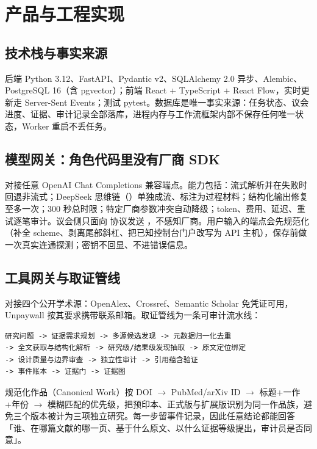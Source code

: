 \section{产品与工程实现}

\subsection{技术栈与事实来源}

后端 Python 3.12、FastAPI、Pydantic v2、SQLAlchemy 2.0 异步、Alembic、PostgreSQL 16（含 pgvector）；前端 React + TypeScript + React Flow，实时更新走 Server-Sent Events；测试 pytest。数据库是唯一事实来源：任务状态、议会进度、证据、审计记录全部落库，进程内存与工作流框架内部不保存任何唯一状态，Worker 重启不丢任务。

\subsection{模型网关：角色代码里没有厂商 SDK}

 对接任意 OpenAI Chat Completions 兼容端点。能力包括：流式解析并在失败时回退非流式；DeepSeek 思维链（）单独成流、标注为过程材料；结构化输出修复至多一次；300 秒总时限；特定厂商参数冲突自动降级；token、费用、延迟、重试逐笔审计。议会侧只面向  协议发送 ，不感知厂商。用户输入的端点会先规范化（补全 scheme、剥离尾部斜杠、把已知控制台门户改写为 API 主机），保存前做一次真实连通探测；密钥不回显、不进错误信息。

\subsection{工具网关与取证管线}

 对接四个公开学术源：OpenAlex、Crossref、Semantic Scholar 免凭证可用，Unpaywall 按其要求携带联系邮箱。取证管线为一条可审计流水线：

\begin{lstlisting}
研究问题 -> 证据需求规划 -> 多源候选发现 -> 元数据归一化去重
-> 全文获取与结构化解析 -> 研究级/结果级发现抽取 -> 原文定位绑定
-> 设计质量与边界审查 -> 独立性审计 -> 引用蕴含验证
-> 事件账本 -> 证据门 -> 证据图
\end{lstlisting}

规范化作品（Canonical Work）按 DOI $\rightarrow$ PubMed/arXiv ID $\rightarrow$ 标题+一作+年份 $\rightarrow$ 模糊匹配的优先级，把预印本、正式版与扩展版识别为同一作品族，避免三个版本被计为三项独立研究。每一步留事件记录，因此任意结论都能回答「谁、在哪篇文献的哪一页、基于什么原文、以什么证据等级提出，审计员是否同意」。

